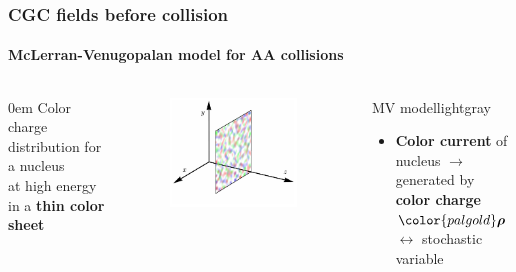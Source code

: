 \documentclass[aspectratio=169,11pt,usenames,dvipsnames]{beamer}
\begin{document}
\begin{frame}
    \frametitle{CGC fields before collision}
    \framesubtitle{McLerran-Venugopalan model for AA collisions}
    \vspace{-10pt}
    \begin{columns}[onlytextwidth,t]

        \begin{center}\itemsep0em 
            \footnotesize\color{lightgray} Color charge distribution for a nucleus\\ at high energy in a {\bfseries \color{palviolet}thin color sheet}
        \end{center}

        \begin{figure}
            \centering
            \includegraphics[width=0.9\textwidth]{images/sheets1.pdf}
        \end{figure}
       \vspace{-5pt}
        \begin{custombox2}{MV model}{lightgray}
            \small
            \begin{varwidth}{0.96\textwidth}
            \begin{itemize}\itemsep0em 
                \item {\color{palteal}\bfseries Color current} of nucleus $\rightarrow$ generated by \\{\color{palgold}\bfseries color charge} $\color{palgold}\boldsymbol{\rho}$ $\leftrightarrow$ stochastic variable
            \end{itemize}
            \end{varwidth}
        \end{custombox2}


\end{columns}
\end{frame}
\end{document}
